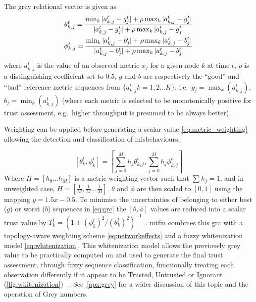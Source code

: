 The grey relational vector is given as
%
\begin{align}
  \label{eq:grc}
  \theta_{k,j}^t = \frac{\min_k|a_{k,j}^t - g_j^t| + \rho \max_k|a_{k,j}^t-g_j^t|}{|a_{k,j}^t-g_j^t| + \rho \max_k|a_{k,j}^t-g_j^t|} \\
  \phi_{k,j}^t = \frac{\min_k|a_{k,j}^t - b_j^t| + \rho \max_k|a_{k,j}^t-b_j^t|}{|a_{k,j}^t-b_j^t| + \rho \max_k|a_{k,j}^t-b_j^t|} \notag 
\end{align}
%
where $a_{k,j}^t$ is the value of an observed metric $x_j$ for a given node $k$ at time $t$, $\rho$ is a distinguishing coefficient set to $0.5$, $g$ and $b$ are respectively the ``good'' and ``bad'' reference metric sequences from $\{a_{k,j}^t k=1,2\dots K\}$, i.e.\ $g_j=\max_k({a_{k,j}^t})$,  $b_j=\min_k({a_{k,j}^t})$ (where each metric is selected to be monotonically positive for trust assessment, e.g.\ higher throughput is presumed to be always better).

Weighting can be applied before generating a scalar value \eqref{eq:metric_weighting} allowing the detection and classification of misbehaviours.

%
\begin{equation}
  \label{eq:metric_weighting}
  [\theta_k^t, \phi_k^t] = \left[\sum_{j=0}^M h_j \theta_{k,j}^t,\sum_{j=0}^M h_j \phi_{k,j}^t \right]
\end{equation}
%
Where $H=[h_0\dots h_M]$ is a metric weighting vector such that $\sum h_j = 1$, and in unweighted case, $H=[\frac{1}{M},\frac{1}{M}\dots\frac{1}{M}]$.
$\theta$ and $\phi$ are then scaled to $[0,1]$ using the mapping $y = 1.5 x - 0.5$.
To minimise the uncertainties of belonging to either best ($g$) or worst ($b$) sequences in \eqref{eq:grc} the $[\theta,\phi]$ values are reduced into a scalar trust value by $T_k^t = ({1+{(\phi_k^t)^2}/{(\theta_k^t)^2}})^{-1}$~\cite{Hong2010}.
\gls{mtfm} combines this \gls{gra} with a topology-aware weighting scheme \eqref{eq:networkeffects} and a fuzzy whitenization model \eqref{eq:whitenization}.
This whitenization model allows the previously grey value to be practically computed on and used to generate the final trust assessment, through fuzzy sequence classification, functionally treating each observation differently if it appear to be Trusted, Untrusted or Ignorant (\autoref{fig:whitenization}) ~\cite{Liu2011}.
See~\autoref{apx:grey} for a wider discussion of this topic and the operation of Grey numbers.

